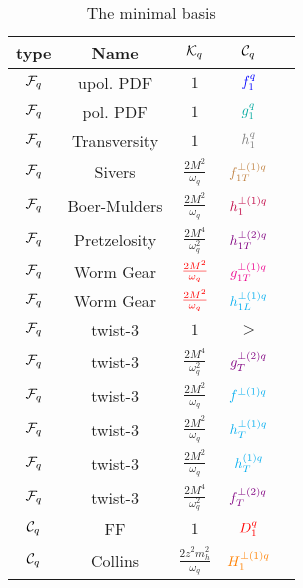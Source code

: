 \documentclass[floatfix,aps,prd,nofootinbib,superscriptaddress,preprint]{revtex4}
\newcommand\3[1]{\boldsymbol{#1}}
\begin{document}
\begin{table}[h!]
\begin{tabular}{|c|c|c|c|c|}
\hline
type       & Name         & ${\cal K}_q$                  & ${\cal C}_q$    \\\hline
${\cal F}_q$ & upol. PDF    & $1$                           & ${\color{blue} f_1^q}$          \\\hline
${\cal F}_q$ & pol. PDF     & $1$                           & $\ppdf$         \\\hline
${\cal F}_q$ & Transversity & $1$                           & $\transversity$ \\\hline
${\cal F}_q$ & Sivers       & $\frac{2M^2}{\omega_q}$       & ${\color{brown} f^{\perp(1)q}_{1T}}$       \\\hline
${\cal F}_q$ & Boer-Mulders & $\frac{2M^2}{\omega_q}$       & ${\color{purple} h^{\perp(1)q}_1 }$  \\\hline
${\cal F}_q$ & Pretzelosity & $\frac{2M^4}{\omega_q^2}$       & ${\color{violet} h^{\perp(2)q}_{1T} }$ \\\hline
${\cal F}_q$ & Worm Gear    & $\color{red}\frac{2M^2}{\omega_q}$                           & ${\color{magenta} g^{\perp (1) q}_{1T}}$          \\\hline
${\cal F}_q$ & Worm Gear    & $\color{red}\frac{2M^2}{\omega_q}$                           & ${\color{cyan}h^{\perp (1) q}_{1L}}$          \\\hline
${\cal F}_q$ & twist-3    & $1$                           & $\gt$          \\\hline
${\cal F}_q$ & twist-3  & $\frac{2M^4}{\omega_q^2}$       & ${\color{violet} g^{\perp(2)q}_{T} }$ \\\hline
${\cal F}_q$ & twist-3  & $\frac{2M^2}{\omega_q}$       & ${\color{cyan}f^{\perp (1) q}}$ \\\hline
${\cal F}_q$ & twist-3  & $\frac{2M^2}{\omega_q}$       & ${\color{cyan}h^{\perp (1) q}_T}$ \\\hline
${\cal F}_q$ & twist-3  & $\frac{2M^2}{\omega_q}$       & ${\color{cyan}h^{(1) q}_T}$ \\\hline
${\cal F}_q$ & twist-3  & $\frac{2M^4}{\omega_q^2}$       & ${\color{violet} f^{\perp(2)q}_{T} }$ \\\hline
\hline
${\cal C}_q$ & FF           & $1$                           & ${\color{red} D_1^{q}}$           \\\hline
${\cal C}_q$ & Collins      & $\frac{2z^2 m_h^2}{\omega_q}$ & ${\color{orange} H^{\perp(1)q}_{1} }$      \\\hline
\end{tabular}
\caption{The minimal basis}
\label{t.mbasis}
\end{table}
\end{document}
